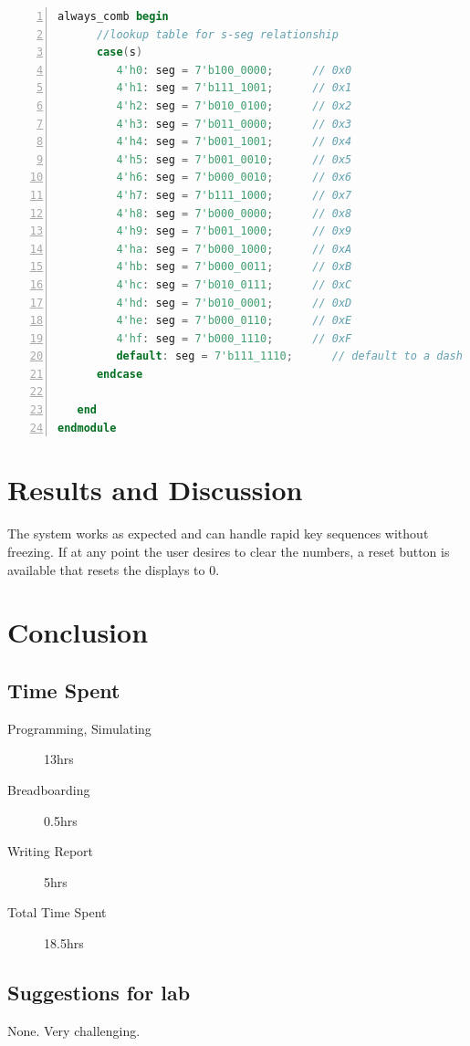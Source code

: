 \documentclass[11pt]{article}
\begin{document}
\begin{lstlisting}[language=Verilog,numbers=left,basicstyle=\footnotesize]
   always_comb begin
      //lookup table for s-seg relationship
      case(s)
         4'h0: seg = 7'b100_0000;      // 0x0
         4'h1: seg = 7'b111_1001;      // 0x1
         4'h2: seg = 7'b010_0100;      // 0x2
         4'h3: seg = 7'b011_0000;      // 0x3
         4'h4: seg = 7'b001_1001;      // 0x4
         4'h5: seg = 7'b001_0010;      // 0x5
         4'h6: seg = 7'b000_0010;      // 0x6
         4'h7: seg = 7'b111_1000;      // 0x7
         4'h8: seg = 7'b000_0000;      // 0x8
         4'h9: seg = 7'b001_1000;      // 0x9
         4'ha: seg = 7'b000_1000;      // 0xA
         4'hb: seg = 7'b000_0011;      // 0xB
         4'hc: seg = 7'b010_0111;      // 0xC
         4'hd: seg = 7'b010_0001;      // 0xD
         4'he: seg = 7'b000_0110;      // 0xE
         4'hf: seg = 7'b000_1110;      // 0xF
         default: seg = 7'b111_1110;      // default to a dash
      endcase
      
   end
endmodule
\end{lstlisting}



\clearpage

\section{Results and Discussion}

The system works as expected and can handle rapid key sequences without freezing. If at any point the user desires to clear the numbers, a reset button is available that resets the displays to 0.

\section{Conclusion}

\subsection{Time Spent}

\begin{description}
	\item[Programming, Simulating] 13hrs
	\item[Breadboarding] 0.5hrs
	\item[Writing Report] 5hrs
	\item[Total Time Spent] 18.5hrs
\end{description}

\subsection{Suggestions for lab}

None. Very challenging.
\end{document}
